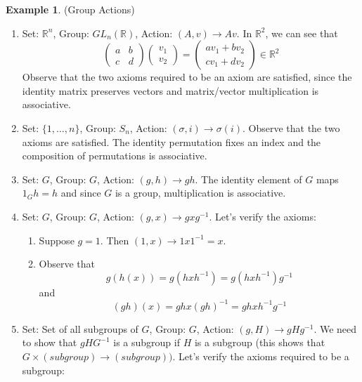 \documentclass[12pt]{article}
\theoremstyle{definition}
\newcommand{\R}{\mathbb{R}}
\newtheorem{example}{\color{WildStrawberry}Example}
\theoremstyle{definition}
\begin{document}
\begin{example}(Group Actions)
\begin{enumerate}
	\item Set: $\R^n$, Group: $GL_n(\R)$, Action: $(A,v) \to Av$. In $\R^2$, we can see that
	\begin{equation}
		\begin{pmatrix}
		a & b \\
		c & d
		\end{pmatrix}
		\begin{pmatrix}
		v_1 \\ v_2
		\end{pmatrix}
		=
		\begin{pmatrix}
		av_1 + bv_2 \\
		cv_1 + dv_2 
		\end{pmatrix}
		\in \R^2
	\end{equation}
	Observe that the two axioms required to be an axiom are satisfied, since the identity matrix preserves vectors and matrix/vector multiplication is associative. 
	\item Set: $\{1, \ldots, n\}$, Group: $S_n$, Action: $(\sigma, i) \to \sigma(i)$. Observe that the two axioms are satisfied. The identity permutation fixes an index and the composition of permutations is associative. 
	\item Set: $G$, Group: $G$, Action: $(g,h) \to gh$. The identity element of $G$ maps $1_G h = h$ and since $G$ is a group, multiplication is associative. 
	\item Set: $G$, Group: $G$, Action: $(g,x) \to gxg^{-1}$. Let's verify the axioms:
	\begin{enumerate}
		\item Suppose $g=1$. Then $(1,x) \to 1 x 1^{-1} = x$. 
		\item Observe that
		\begin{equation}
			g(h(x)) = g(hxh^{-1}) = g(hxh^{-1})g^{-1} 
		\end{equation}
		and
		\begin{equation}
			(gh)(x) = gh x (gh)^{-1} = gh x h^{-1} g^{-1}
		\end{equation}
	\end{enumerate}
	\item Set: Set of all subgroups of $G$, Group: $G$, Action: $(g,H) \to gHg^{-1}$. We need to show that $gHG^{-1}$ is a subgroup if $H$ is a subgroup (this shows that $G \times (subgroup) \to (subgroup))$. Let's verify the axioms required to be a subgroup:
	\begin{enumerate}

\end{enumerate}
\end{enumerate}
\end{example}
\end{document}
